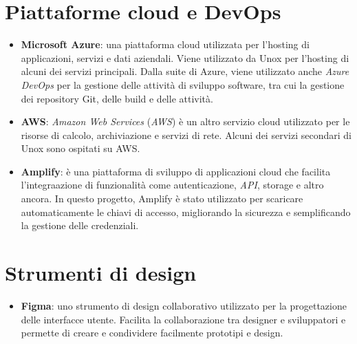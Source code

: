 \section*{Piattaforme cloud e DevOps}
\begin{itemize}
\item \textbf{Microsoft Azure}: una piattaforma cloud utilizzata per l'hosting di applicazioni, servizi e dati aziendali. Viene utilizzato da Unox per l'hosting di alcuni dei servizi principali. Dalla suite di Azure, viene utilizzato anche \textit{Azure DevOps} per la gestione delle attività di sviluppo software, tra cui la gestione dei repository Git, delle build e delle attività.
\item \textbf{AWS}: \textit{Amazon Web Services} (\textit{AWS}) è un altro servizio cloud utilizzato per le risorse di calcolo, archiviazione e servizi di rete. Alcuni dei servizi secondari di Unox sono ospitati su AWS.
\item \textbf{Amplify}: è una piattaforma di sviluppo di applicazioni cloud che facilita l'integraazione di funzionalità come autenticazione, \textit{API}, storage e altro ancora. In questo progetto, Amplify è stato utilizzato per scaricare automaticamente le chiavi di accesso, migliorando la sicurezza e semplificando la gestione delle credenziali.
\end{itemize}

\section*{Strumenti di design}
\begin{itemize}
\item \textbf{Figma}: uno strumento di design collaborativo utilizzato per la progettazione delle interfacce utente. Facilita la collaborazione tra designer e sviluppatori e permette di creare e condividere facilmente prototipi e design.
\end{itemize}


\newpage